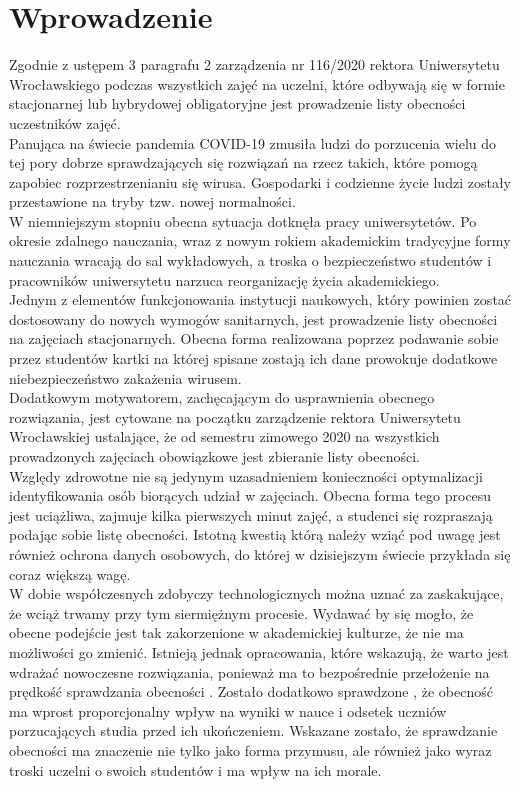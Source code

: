 \documentclass[declaration,shortabstract, mgr]{iithesis}
\author {Dawid Szczyrk}
\begin{document}
\chapter{Wprowadzenie}


\indent Zgodnie z ustępem 3 paragrafu 2 zarządzenia nr 116/2020 rektora Uniwersytetu Wrocławskiego \cite{uwr} podczas wszystkich zajęć na uczelni, które odbywają się w formie stacjonarnej lub hybrydowej obligatoryjne jest prowadzenie listy obecności uczestników zajęć.\\
\indent Panująca na świecie pandemia COVID-19 zmusiła ludzi do porzucenia wielu do tej pory dobrze sprawdzających się rozwiązań na rzecz takich, które pomogą zapobiec rozprzestrzenianiu się wirusa. Gospodarki i codzienne życie ludzi zostały przestawione na tryby tzw. nowej normalności.\\
\indent W niemniejszym stopniu obecna sytuacja dotknęła pracy uniwersytetów. Po okresie zdalnego nauczania, wraz z nowym rokiem akademickim tradycyjne formy nauczania wracają do sal wykładowych, a troska o bezpieczeństwo studentów i pracowników uniwersytetu narzuca reorganizację życia akademickiego.\\
\indent Jednym z elementów funkcjonowania instytucji naukowych, który powinien zostać dostosowany do nowych wymogów sanitarnych, jest prowadzenie listy obecności na zajęciach stacjonarnych. Obecna forma realizowana poprzez podawanie sobie przez studentów kartki na której spisane zostają ich dane prowokuje dodatkowe niebezpieczeństwo zakażenia wirusem. \\
\indent Dodatkowym motywatorem, zachęcającym do usprawnienia obecnego rozwiązania, jest cytowane na początku zarządzenie rektora Uniwersytetu Wrocławskiej ustalające, że od semestru zimowego 2020 na wszystkich prowadzonych zajęciach obowiązkowe jest zbieranie listy obecności. \\
\indent Względy zdrowotne nie są jedynym uzasadnieniem konieczności optymalizacji identyfikowania osób biorących udział w zajęciach. Obecna forma tego procesu jest uciążliwa, zajmuje kilka pierwszych minut zajęć, a studenci się rozpraszają podając sobie listę obecności. Istotną kwestią którą należy wziąć pod uwagę jest również ochrona danych osobowych, do której w dzisiejszym świecie przykłada się coraz większą wagę.\\
\indent W dobie współczesnych zdobyczy technologicznych można uznać za zaskakujące, że wciąż trwamy przy tym siermiężnym procesie. Wydawać by się mogło, że obecne podejście jest tak zakorzenione w akademickiej kulturze, że nie ma możliwości go zmienić. Istnieją jednak opracowania, które wskazują, że warto jest wdrażać nowoczesne rozwiązania, ponieważ ma to bezpośrednie przełożenie na prędkość sprawdzania obecności \cite{lcd}. Zostało dodatkowo sprawdzone \cite{theory_base}, że obecność ma wprost proporcjonalny wpływ na wyniki w nauce i odsetek uczniów porzucających studia przed ich ukończeniem. Wskazane zostało, że sprawdzanie obecności ma znaczenie nie tylko jako forma przymusu, ale również jako wyraz troski uczelni o swoich studentów i ma wpływ na ich morale.\\
\end{document}
